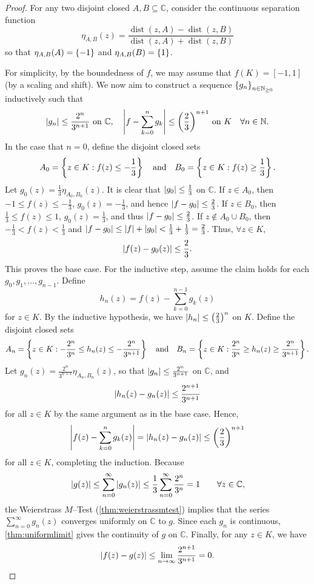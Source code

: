 \begin{proof}
    For any two disjoint closed \(A,B\subseteq\mathbb{C}\), consider the continuous separation function \[\eta_{A,B}(z)=\frac{\operatorname{dist}(z,A)-\operatorname{dist}(z,B)}{\operatorname{dist}(z,A)+\operatorname{dist}(z,B)}\] so that \(\eta_{A,B}(A)=\cbraces{-1}\) and \(\eta_{A,B}(B)=\cbraces{1}\).

    For simplicity, by the boundedness of \(f\), we may assume that \(f(K)=[-1,1]\) (by a scaling and shift). We now aim to construct a sequence \(\cbraces{g_n}_{n\in\mathbb{N}_{\geq 0}}\) inductively such that \[\abs{g_n}\leq\frac{2^n}{3^{n+1}}\text{ on }\mathbb{C},\quad\abs{f-\sum_{k=0}^n g_k}\leq\qty(\frac23)^{n+1}\text{ on }K\quad\forall n\in\mathbb{N}.\]
    In the case that \(n=0\), define the disjoint closed sets \[A_0=\cbraces{z\in K}{f(z)\leq-\frac13}\qand B_0=\cbraces{z\in K}{f(z)\geq\frac13}.\]
    Let \(\textstyle g_0(z)=\frac13\eta_{A_0,B_0}(z)\). It is clear that \(\textstyle \abs{g_0}\leq\frac13\) on \(\mathbb{C}\). If \(z\in A_0\), then \(\textstyle -1\leq f(z)\leq-\frac13\), \(\textstyle g_0(z)=-\frac13\), and hence \(\textstyle \abs{f-g_0}\leq\frac23\). If \(z\in B_0\), then \(\textstyle \frac13\leq f(z)\leq1\), \(\textstyle g_0(z)=\frac13\), and thus \(\textstyle \abs{f-g_0}\leq\frac23\). If \(z\notin A_0\cup B_0\), then \(\textstyle -\frac13<f(z)<\frac13\) and \(\textstyle \abs{f-g_0}\leq\abs{f}+\abs{g_0}<\frac13+\frac13=\frac23\). Thus, \(\forall z\in K\), \[\abs{f(z)-g_0(z)}\leq\frac23.\]
    This proves the base case. For the inductive step, assume the claim holds for each \(g_0,g_1,\dots,g_{n-1}\). Define \[h_n(z)=f(z)-\sum_{k=0}^{n-1}g_k(z)\] for \(z\in K\). By the inductive hypothesis, we have \(\abs{h_n}\leq\qty(\frac23)^n\) on \(K\). Define the disjoint closed sets \[A_n=\cbraces{z\in K}{-\frac{2^n}{3^n}\leq h_n(z)\leq-\frac{2^n}{3^{n+1}}}\qand B_n=\cbraces{z\in K}{\frac{2^n}{3^n}\geq h_n(z)\geq\frac{2^n}{3^{n+1}}}.\]
    Let \(g_n(z)=\frac{2^n}{3^{n+1}}\eta_{A_n,B_n}(z)\), so that \(\abs{g_n}\leq\frac{2^n}{3^{n+1}}\) on \(\mathbb{C}\), and \[\abs{h_n(z)-g_n(z)}\leq\frac{2^{n+1}}{3^{n+1}}\] for all \(z\in K\) by the same argument as in the base case. Hence, \[\abs{f(z)-\sum_{k=0}^n g_k(z)}=\abs{h_n(z)-g_n(z)}\leq\qty(\frac23)^{n+1}\] for all \(z\in K\), completing the induction. Because \[\abs{g(z)}\leq\sum_{n=0}^\infty\abs{g_n(z)}\leq\frac13\sum_{n=0}^\infty\frac{2^n}{3^n}=1\qquad\forall z\in\mathbb{C},\] the Weierstrass \(M\)--Test (\cref{thm:weierstrassmtest}) implies that the series \(\sum_{n=0}^\infty g_n(z)\) converges uniformly on \(\mathbb{C}\) to \(g\). Since each \(g_n\) is continuous, \cref{thm:uniformlimit} gives the continuity of \(g\) on \(\mathbb{C}\). Finally, for any \(z\in K\), we have \[\abs{f(z)-g(z)}\leq\lim_{n\to\infty}\frac{2^{n+1}}{3^{n+1}}=0.\qedhere\]
\end{proof}
